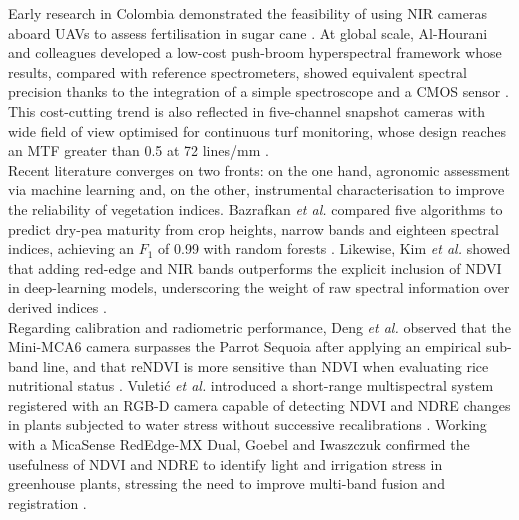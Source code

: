 \noindent Early research in Colombia demonstrated the feasibility of using
NIR cameras aboard UAVs to assess fertilisation in sugar cane
\cite{Navia2016MultispectralUAV}.  At global scale, Al-Hourani and
colleagues developed a low-cost push-broom hyperspectral framework whose
results, compared with reference spectrometers, showed equivalent
spectral precision thanks to the integration of a simple spectroscope
and a CMOS sensor \cite{Al-Hourani2023LinePlatforms}.  This cost-cutting
trend is also reflected in five-channel snapshot cameras with wide field
of view optimised for continuous turf monitoring, whose design reaches
an MTF greater than 0.5 at 72 lines/mm
\cite{Smeesters2023Wide-Field-of-ViewMonitoring}.\\

\noindent Recent literature converges on two fronts: on the one hand,
agronomic assessment via machine learning and, on the other,
instrumental characterisation to improve the reliability of vegetation
indices.  Bazrafkan \emph{et al.} compared five algorithms to predict
dry-pea maturity from crop heights, narrow bands and eighteen spectral
indices, achieving an \(F_1\) of 0.99 with random forests
\cite{Bazrafkan2023PredictingUASs}.  Likewise, Kim \emph{et al.} showed
that adding red-edge and NIR bands outperforms the explicit inclusion of
NDVI in deep-learning models, underscoring the weight of raw spectral
information over derived indices \cite{Kim2023DeepClassification}.\\

\noindent Regarding calibration and radiometric performance,
Deng \emph{et al.} observed that the Mini-MCA6 camera surpasses the
Parrot Sequoia after applying an empirical sub-band line, and that
reNDVI is more sensitive than NDVI when evaluating rice nutritional
status \cite{Deng2018UAV-basedCameras}.  Vuletić \emph{et al.}
introduced a short-range multispectral system registered with an RGB-D
camera capable of detecting NDVI and NDRE changes in plants subjected to
water stress without successive recalibrations
\cite{Vuletic2023Close-rangeSystem}.  Working with a MicaSense RedEdge-MX
Dual, Goebel and Iwaszczuk confirmed the usefulness of NDVI and NDRE to
identify light and irrigation stress in greenhouse plants, stressing the
need to improve multi-band fusion and registration
\cite{Goebel2023SPECTRALCAMERA}.\\

